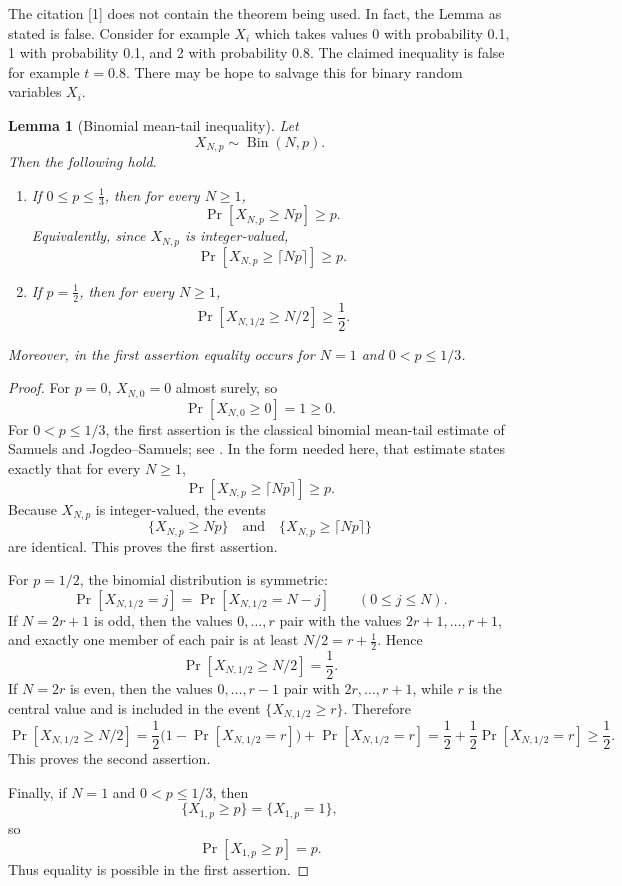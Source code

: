 \documentclass[12pt]{article}
\theoremstyle{definition}
\theoremstyle{plain}
\newtheorem{lemma}[definition]{Lemma}
\theoremstyle{remark}
\newcommand{\review}[1]{\begin{reviewbox}#1\end{reviewbox}}
\begin{document}
\review{The citation [1] does not contain the theorem being used. In fact, the Lemma as stated is false. Consider for example $X_i$ which takes values 0 with probability 0.1, 1 with probability 0.1, and 2 with probability 0.8. The claimed inequality is false for example $t=0.8$. There may be hope to salvage this for binary random variables $X_i$.}

\begin{lemma}[Binomial mean-tail inequality]\label{lem:binomial}
Let
\[
X_{N,p}\sim\operatorname{Bin}(N,p).
\]
Then the following hold.

\begin{enumerate}
\item If \(0\le p\le \frac13\), then for every \(N\ge1\),
\[
\Pr[X_{N,p}\ge Np]\ge p.
\]
Equivalently, since \(X_{N,p}\) is integer-valued,
\[
\Pr[X_{N,p}\ge \lceil Np\rceil]\ge p.
\]

\item If \(p=\frac12\), then for every \(N\ge1\),
\[
\Pr[X_{N,1/2}\ge N/2]\ge \frac12.
\]
\end{enumerate}
Moreover, in the first assertion equality occurs for \(N=1\) and \(0<p\le1/3\).
\end{lemma}

\begin{proof}
For \(p=0\), \(X_{N,0}=0\) almost surely, so
\[
\Pr[X_{N,0}\ge0]=1\ge0.
\]
For \(0<p\le1/3\), the first assertion is the classical binomial mean-tail estimate of Samuels and Jogdeo--Samuels; see \cite{Samuels1965,JogdeoSamuels1968}. In the form needed here, that estimate states exactly that for every \(N\ge1\),
\[
\Pr[X_{N,p}\ge \lceil Np\rceil]\ge p.
\]
Because \(X_{N,p}\) is integer-valued, the events
\[
\{X_{N,p}\ge Np\}
\quad\text{and}\quad
\{X_{N,p}\ge \lceil Np\rceil\}
\]
are identical. This proves the first assertion.

For \(p=1/2\), the binomial distribution is symmetric:
\[
\Pr[X_{N,1/2}=j]=\Pr[X_{N,1/2}=N-j]
\qquad (0\le j\le N).
\]
If \(N=2r+1\) is odd, then the values \(0,\ldots,r\) pair with the values \(2r+1,\ldots,r+1\), and exactly one member of each pair is at least \(N/2=r+\frac12\). Hence
\[
\Pr[X_{N,1/2}\ge N/2]=\frac12.
\]
If \(N=2r\) is even, then the values \(0,\ldots,r-1\) pair with \(2r,\ldots,r+1\), while \(r\) is the central value and is included in the event \(\{X_{N,1/2}\ge r\}\). Therefore
\[
\Pr[X_{N,1/2}\ge N/2]
=
\frac12\bigl(1-\Pr[X_{N,1/2}=r]\bigr)
+\Pr[X_{N,1/2}=r]
=
\frac12+\frac12\Pr[X_{N,1/2}=r]
\ge\frac12.
\]
This proves the second assertion.

Finally, if \(N=1\) and \(0<p\le1/3\), then
\[
\{X_{1,p}\ge p\}=\{X_{1,p}=1\},
\]
so
\[
\Pr[X_{1,p}\ge p]=p.
\]
Thus equality is possible in the first assertion.
\end{proof}
\end{document}

